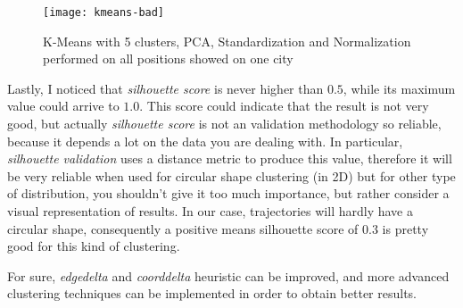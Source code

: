 \begin{figure}[bt]
	\centering
	\texttt{[image: kmeans-bad]}
	\caption{K-Means with 5 clusters, PCA, Standardization and Normalization performed on all positions showed on one city}
	\label{fig:kmeans-bad}
\end{figure}

Lastly, I noticed that \textit{silhouette score} is never higher than $0.5$, while its maximum value could arrive to $1.0$. This score could indicate that the result is not very good, but actually \textit{silhouette score} is not an validation methodology so reliable, because it depends a lot on the data you are dealing with. In particular, \textit{silhouette validation} uses a distance metric to produce this value, therefore it will be very reliable when used for circular shape clustering (in 2D) but for other type of distribution, you shouldn't give it too much importance, but rather consider a visual representation of results. In our case, trajectories will hardly have a circular shape, consequently a positive means silhouette score of $0.3$ is pretty good for this kind of clustering.

For sure, \textit{edgedelta} and \textit{coorddelta} heuristic can be improved, and more advanced clustering techniques can be implemented in order to obtain better results. 